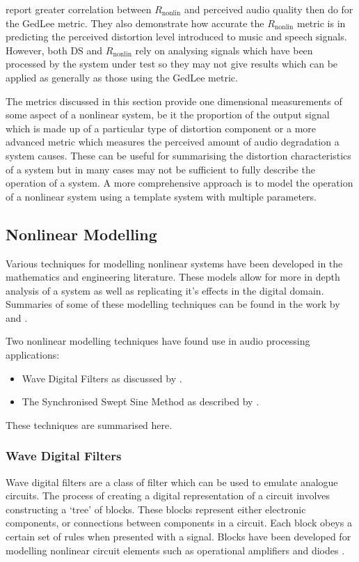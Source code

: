 			\citet{tan2004predicting} report greater correlation between $R_{\mathrm{nonlin}}$ and perceived
			audio quality then \citet{lee2003auditory} do for the GedLee metric. They also demonstrate how
			accurate the $R_{\mathrm{nonlin}}$ metric is in predicting the perceived distortion level introduced
			to music and speech signals. However, both $\mathrm{DS}$ and $R_{\mathrm{nonlin}}$ rely on analysing
			signals which have been processed by the system under test so they may not give results which can be
			applied as generally as those using the GedLee metric.

			The metrics discussed in this section provide one dimensional measurements of some aspect of a
			nonlinear system, be it the proportion of the output signal which is made up of a particular type of
			distortion component or a more advanced metric which measures the perceived amount of audio
			degradation a system causes. These can be useful for summarising the distortion characteristics of a
			system but in many cases may not be sufficient to fully describe the operation of a system. A more
			comprehensive approach is to model the operation of a nonlinear system using a template system with
			multiple parameters.

	\subsection{Nonlinear Modelling}
	\label{sec:Excitation-Analysis-Modelling}
		Various techniques for modelling nonlinear systems have been developed in the mathematics and engineering
		literature. These models allow for more in depth analysis of a system as well as replicating it's effects in
		the digital domain. Summaries of some of these modelling techniques can be found in the work by
		\citet{janczak2005identification} and \citet{ogunfunmi2007adaptive}.

		Two nonlinear modelling techniques have found use in audio processing applications:

		\begin{itemize}
			\item Wave Digital Filters as discussed by \citet{fettweis1986wave}.
			\item The Synchronised Swept Sine Method as described by \citet{novak2010nonlinear}.
		\end{itemize}

		These techniques are summarised here.

		\subsubsection{Wave Digital Filters}
			Wave digital filters are a class of filter which can be used to emulate analogue circuits. The
			process of creating a digital representation of a circuit involves constructing a `tree' of blocks.
			These blocks represent either electronic components, or connections between components in a
			circuit. Each block obeys a certain set of rules when presented with a signal. Blocks have been
			developed for modelling nonlinear circuit elements such as operational amplifiers and diodes
			\citep{paiva2012emulation}.

